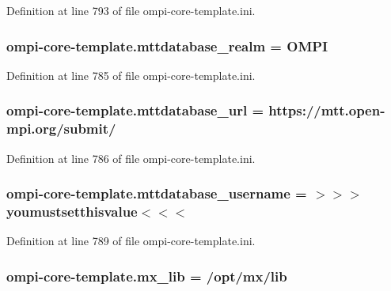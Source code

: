 Definition at line 793 of file ompi-\/core-\/template.\-ini.

\hypertarget{namespaceompi-core-template_a7851b0983ed5152042bb656ad006de80}{
\subsubsection[{mttdatabase\-\_\-realm}]{\setlength{\rightskip}{0pt plus 5cm}ompi-\/core-\/template.\-mttdatabase\-\_\-realm = O\-M\-P\-I}}\label{namespaceompi-core-template_a7851b0983ed5152042bb656ad006de80}


Definition at line 785 of file ompi-\/core-\/template.\-ini.

\hypertarget{namespaceompi-core-template_a022cb0fe389922ada0eeb76d81958a23}{
\subsubsection[{mttdatabase\-\_\-url}]{\setlength{\rightskip}{0pt plus 5cm}ompi-\/core-\/template.\-mttdatabase\-\_\-url = https\-://mtt.\-open-\/mpi.\-org/submit/}}\label{namespaceompi-core-template_a022cb0fe389922ada0eeb76d81958a23}


Definition at line 786 of file ompi-\/core-\/template.\-ini.

\hypertarget{namespaceompi-core-template_a537a657b1826b531bff2e1f8a432d7b0}{
\subsubsection[{mttdatabase\-\_\-username}]{\setlength{\rightskip}{0pt plus 5cm}ompi-\/core-\/template.\-mttdatabase\-\_\-username = $>$$>$$>$youmustsetthisvalue$<$$<$$<$}}\label{namespaceompi-core-template_a537a657b1826b531bff2e1f8a432d7b0}


Definition at line 789 of file ompi-\/core-\/template.\-ini.

\hypertarget{namespaceompi-core-template_ad39b6930be020ebedb6e85a5fa1d6602}{
\subsubsection[{mx\-\_\-lib}]{\setlength{\rightskip}{0pt plus 5cm}ompi-\/core-\/template.\-mx\-\_\-lib = /opt/mx/lib}}\label{namespaceompi-core-template_ad39b6930be020ebedb6e85a5fa1d6602}


